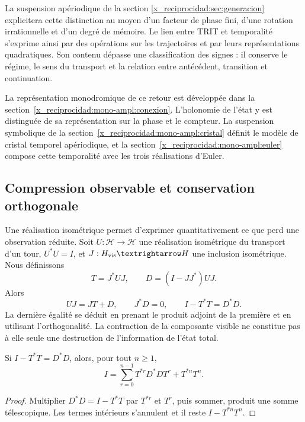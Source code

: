 La suspension apériodique de la section \ref{x_reciprocidad:sec:generacion} explicitera
cette distinction au moyen d’un facteur de phase fini, d’une rotation irrationnelle
et d’un degré de mémoire. Le lien entre TRIT et temporalité s’exprime ainsi
par des opérations sur les trajectoires et par leurs représentations
quadratiques. Son contenu dépasse une classification des signes : il conserve le
régime, le sens du transport et la relation entre antécédent,
transition et continuation.



La représentation monodromique de ce retour est développée dans la
section~\ref{x_reciprocidad:mono-ampl:conexion}. L’holonomie de
l’état y est distinguée de sa représentation sur la phase et le compteur. La suspension
symbolique de la section~\ref{x_reciprocidad:mono-ampl:cristal} définit le modèle de
cristal temporel apériodique, et la section~\ref{x_reciprocidad:mono-ampl:euler}
compose cette temporalité avec les trois réalisations d’Euler.

\subsection{Compression observable et conservation orthogonale}

Une réalisation isométrique permet d’exprimer quantitativement ce que perd une observation réduite. Soit \(U:\mathcal H\to\mathcal H\) une réalisation isométrique du transport d’un tour, \(U^*U=I\), et \(J:\mathcal H_{\rm vis}\to\mathcal H\) une inclusion isométrique. Nous définissons
\[
 T=J^*UJ,\qquad D=(I-JJ^*)UJ.
\]
Alors
\begin{equation}
 UJ=JT+D,\qquad J^*D=0,\qquad I-T^*T=D^*D.
 \label{x_reciprocidad:eq:conservacion-ortogonal}
\end{equation}
La dernière égalité se déduit en prenant le produit adjoint de la première et en utilisant l’orthogonalité. La contraction de la composante visible ne constitue pas à elle seule une destruction de l’information de l’état total.

\begin{proposition}
Si \(I-T^*T=D^*D\), alors, pour tout \(n\ge1\),
\begin{equation}
 I=\sum_{r=0}^{n-1}T^{*r}D^*DT^r+T^{*n}T^n.
 \label{x_reciprocidad:eq:telescopia}
\end{equation}
\end{proposition}
\begin{proof}
Multiplier \(D^*D=I-T^*T\) par \(T^{*r}\) et \(T^r\), puis sommer, produit une somme télescopique. Les termes intérieurs s’annulent et il reste \(I-T^{*n}T^n\).
\end{proof}

